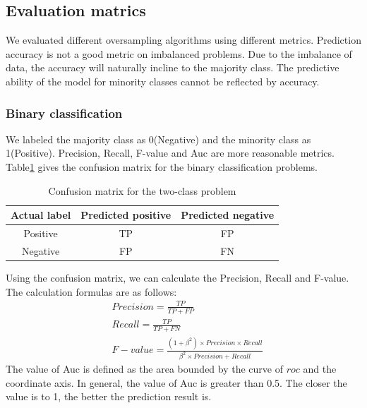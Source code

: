 \documentclass[runningheads]{llncs}
\begin{document}
\subsection{Evaluation matrics}
We evaluated different oversampling algorithms using different metrics. 
Prediction accuracy is not a good metric on imbalanced problems.
Due to the imbalance of data, the accuracy will naturally incline to the majority class.
The predictive ability of the model for minority classes cannot be reflected by accuracy.
\subsubsection{Binary classification}
We labeled the majority class as 0(Negative) and the minority class as 1(Positive).
Precision, Recall, F-value and Auc are more reasonable metrics.
Table\ref{table1} gives the confusion matrix for the binary classification problems.
\begin{table}[tb]
  \caption{Confusion matrix for the two-class problem}
  \label{table1}
  \centering
  \begin{tabular}{@{}ccc@{}}
  \toprule
  Actual label & \multicolumn{1}{l}{Predicted positive} & \multicolumn{1}{l}{Predicted negative} \\ \midrule
  Positive     & TP                                     & FP                                     \\
  Negative     & FP                                     & FN                                     \\ \bottomrule
  \end{tabular}
\end{table}
  Using the confusion matrix, 
  we can calculate the Precision, Recall and F-value. The calculation formulas are as follows:
  \begin{equation}
    \begin{aligned}
    & Precision=\frac{TP}{TP+FP}  \\ 
    & Recall=\frac{TP}{TP+FN}     \\
    & F-value=\frac{(1+\beta^2) \times Precision \times Recall}{\beta^2 \times Precision+Recall}
  \end{aligned}
  \end{equation}
  The value of Auc is defined as the area bounded by the curve of $roc$ and the coordinate axis.
In general, the value of Auc is greater than 0.5. 
The closer the value is to 1, the better the prediction result is.
\end{document}
